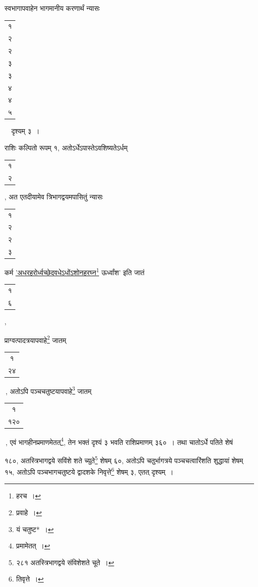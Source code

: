 \documentclass[10pt, openany]{book}
\begin{document}
{{{{स्वभागापवाहेन भागमानीय करणार्थं न्यासः\textendash \hspace{1mm} \begin{tabular}{r|}१ \\
२ \\ 
 २ \\
३ \\ 
३ \\
 ४ \\
 ४ \\
 ५ \end{tabular}} ~~दृश्यम् ३~।}
\vspace{3mm}

{राशिः कल्पितो रूपम् १, अतोऽर्धेऽपास्तेऽवशिष्यतेऽर्धम्\begin{tabular}{r}१\\ २\end{tabular}, अत
एतदीयामेव त्रिभागद्वयमपासितुं न्यासः \begin{tabular}{|c|} १\\ २\\ २ \\३\\\hline \end{tabular} कर्म
\hyperref[40]{'अधरहरोर्ध्वच्छेदवधेऽधोंऽशोनहरघ्न\renewcommand{\thefootnote}{\s ३}\footnote{\s *हरच~।} ऊर्ध्वांश'} इति जातं\begin{tabular}{r}१\\ ६\end{tabular},}
{प्राग्वत्पादत्रयापवाहे\renewcommand{\thefootnote}{\s ४}\footnote{\s *प्रवाहे~।} जातम् \begin{tabular}{|c|} १\\ २४\\\hline \end{tabular}\,, अतोऽपि
पञ्चचतुष्टयापवाहे\renewcommand{\thefootnote}{\s ५}\footnote{\s यं
चतुष्ट*~।} जातम् \begin{tabular}{|c|} १\\ १२०\\\hline \end{tabular}\,, एवं भागहीनप्रमाणमेतत्\renewcommand{\thefootnote}{\s ६}\footnote{\s *प्रमामेतत्~।}, तेन भक्तं दृश्यं ३ भवति राशिप्रमाणम् ३६०~। तथा
चातोऽर्धे पतिते शेषं}
{१८०, अतस्त्रिभागद्वये सविंशे शते च्युते\renewcommand{\thefootnote}{\s ७}\footnote{\s २८१ अतस्त्रिभागद्वये संविशेशते चूते~।} शेषम् ६०, अतोऽपि
चतुर्भागत्रये पञ्चचत्वारिंशति}
{शुद्धायां शेषम् १५, अतोऽपि पञ्चभागचतुष्टये द्वादशके निवृत्ते\renewcommand{\thefootnote}{\s ८}\footnote{\s तिवृत्ते~।} शेषम्
३, एतत् दृश्यम्~।}
\vspace{3mm}

}}
\end{document}
